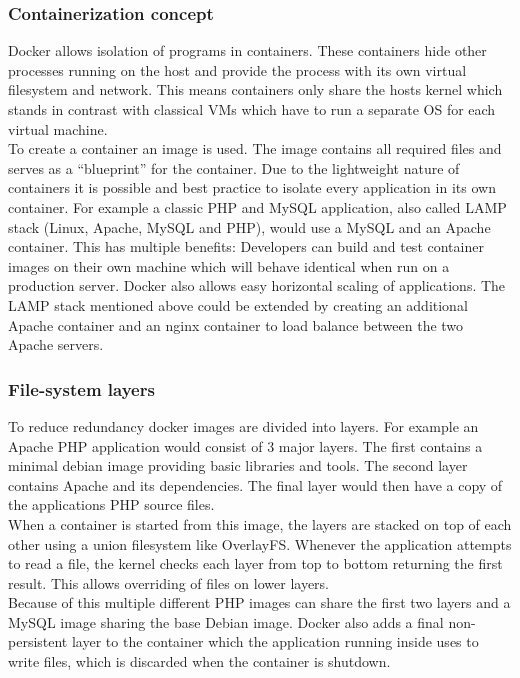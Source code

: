 \documentclass[conference,compsoc,final,a4paper]{IEEEtran}
\begin{document}
\subsubsection*{Containerization concept}
Docker allows isolation of programs in containers. These containers hide other processes running on the host and provide the process with its own virtual filesystem
and network. This means containers only share the hosts kernel which stands in contrast with classical VMs which have to run a separate OS for
each virtual machine. \cite{bernstein2014containers}\\
To create a container an image is used. The image contains all required files and serves as a \enquote{blueprint} for the container. \cite{bernstein2014containers}
Due to the lightweight nature of containers it is possible and best practice to isolate every application in its own container. \cite{dockerBestPractices} For example a
classic PHP and MySQL application, also called LAMP stack (Linux, Apache, MySQL and PHP), would use a MySQL and an Apache container. This has multiple benefits:
Developers can build and test container images on their own machine which will behave identical when run on a production server. Docker also allows easy horizontal
scaling of applications. The LAMP stack mentioned above could be extended by creating an additional Apache container and an nginx container
to load balance between the two Apache servers.
\subsubsection*{File-system layers}
To reduce redundancy docker images are divided into layers. \cite{dockerBestPractices} For example an Apache PHP application would consist of 3
major layers. The first contains a minimal debian image providing basic libraries and tools. The second layer contains Apache and its dependencies. The final
layer would then have a copy of the applications PHP source files. \\
When a container is started from this image, the layers are stacked on top of each other
using a union filesystem like OverlayFS\cite{overlayfs}. Whenever the application attempts to read a file, the kernel checks each layer from top to bottom
returning the first result. This allows overriding of files on lower layers. \\
Because of this multiple different PHP images can share the first two layers and a MySQL image
sharing the base Debian image. Docker also adds a final non-persistent layer to the container which the application running inside uses to write files,
which is discarded when the container is shutdown.
\end{document}
